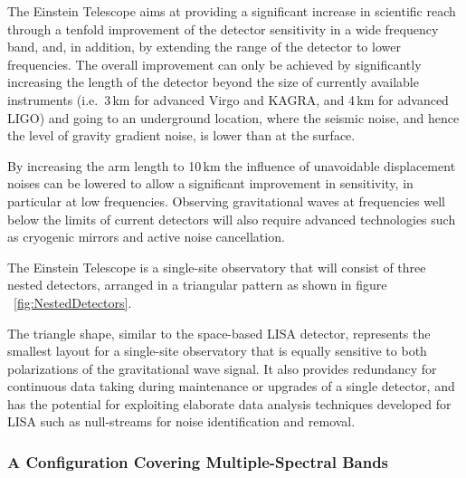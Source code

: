 {The Einstein Telescope aims at providing a significant increase in scientific 
reach through a tenfold improvement of the detector sensitivity in a wide
frequency band, and, in addition, by extending the range of the detector
to lower frequencies. 
The overall improvement can only be achieved by significantly increasing the
length of the detector beyond the size of currently available instruments (i.e.\
3\,km for advanced Virgo and KAGRA, and 4\,km for advanced LIGO) and going to an
underground location, where the seismic noise, and hence the level of gravity
gradient noise, is lower than at the surface. 


By increasing the arm length to 10\,km the influence of unavoidable displacement
noises can be lowered to allow a significant improvement in sensitivity, in
particular at low frequencies. Observing gravitational waves at frequencies well
below the limits of current detectors will also require advanced technologies
such as cryogenic mirrors and active noise cancellation.

The Einstein Telescope is a single-site observatory that will consist of three
nested detectors, arranged in a triangular pattern as shown in 
figure\,~\ref{fig:NestedDetectors}. 
}

The triangle shape, similar to the space-based LISA detector, represents the smallest layout for a single-site observatory that is equally sensitive
to both polarizations of the gravitational wave signal. It also provides
redundancy for continuous data taking during maintenance or upgrades of a single detector, and has the potential for exploiting elaborate data analysis techniques developed for LISA such as null-streams for noise identification and removal.

\subsubsection{A Configuration Covering Multiple-Spectral Bands}

